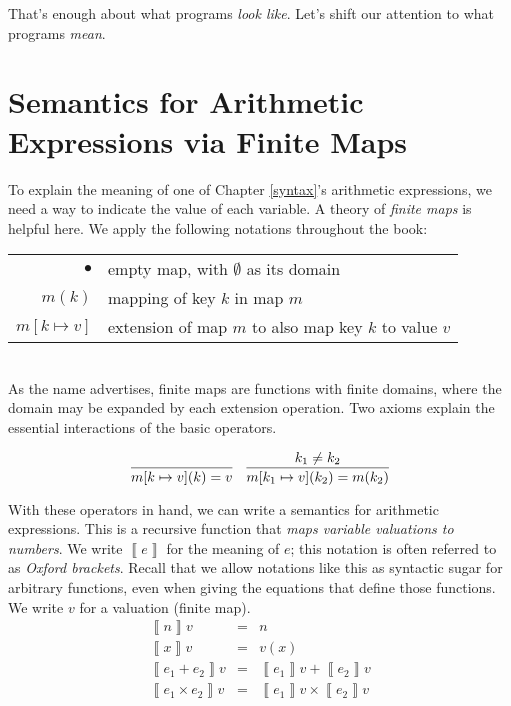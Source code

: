 \documentclass{amsbook}
\theoremstyle{definition}
\theoremstyle{remark}
\numberwithin{section}{chapter}
\numberwithin{equation}{chapter}
\begin{document}
That's enough about what programs \emph{look like}.
Let's shift our attention to what programs \emph{mean}.

\section{Semantics for Arithmetic Expressions via Finite Maps}

\newcommand{\mempty}[0]{\bullet}
\newcommand{\msel}[2]{#1(#2)}
\newcommand{\mupd}[3]{#1[#2 \mapsto #3]}

To explain the meaning of one of Chapter \ref{syntax}'s arithmetic expressions, we need a way to indicate the value of each variable.
\encoding
A theory of \emph{finite maps} is helpful here.
We apply the following notations throughout the book: \\

\begin{tabular}{rl}
  $\mempty$ & empty map, with $\emptyset$ as its domain \\
  $\msel{m}{k}$ & mapping of key $k$ in map $m$ \\
  $\mupd{m}{k}{v}$ & extension of map $m$ to also map key $k$ to value $v$
\end{tabular} \\

As the name advertises, finite maps are functions with finite domains, where the domain may be expanded by each extension operation.
Two axioms explain the essential interactions of the basic operators.

$$\infer{\msel{\mupd{m}{k}{v}}{k} = v}{}
\quad
\infer{\msel{\mupd{m}{k_1}{v}}{k_2} = m(k_2)}{
  k_1 \neq k_2
}$$

\newcommand{\denote}[1]{{\left \llbracket #1 \right \rrbracket}}

With these operators in hand, we can write a semantics for arithmetic expressions.
This is a recursive function that \emph{maps variable valuations to numbers}.
We write $\denote{e}$ for the meaning of $e$; this notation is often referred to as \emph{Oxford brackets}.
Recall that we allow notations like this as syntactic sugar for arbitrary functions, even when giving the equations that define those functions.
We write $v$ for a valuation (finite map).
\encoding
\begin{eqnarray*}
  \denote{n}v &=& n \\
  \denote{x}v &=& v(x) \\
  \denote{e_1 + e_2}v &=& \denote{e_1}v + \denote{e_2}v \\
  \denote{e_1 \times e_2}v &=& \denote{e_1}v \times \denote{e_2}v
\end{eqnarray*}
\end{document}
